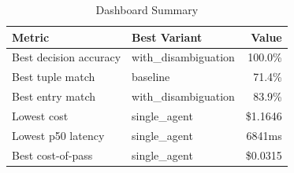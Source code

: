 \begin{table}[htbp]
\centering
\caption{Dashboard Summary}
\label{tab:summary}
\begin{tabular}{l l r}
\toprule
Metric & Best Variant & Value \\
\midrule
  Best decision accuracy & with\_disambiguation & 100.0\% \\
  Best tuple match & baseline & 71.4\% \\
  Best entry match & with\_disambiguation & 83.9\% \\
  Lowest cost & single\_agent & \$1.1646 \\
  Lowest p50 latency & single\_agent & 6841ms \\
  Best cost-of-pass & single\_agent & \$0.0315 \\
\bottomrule
\end{tabular}
\end{table}
